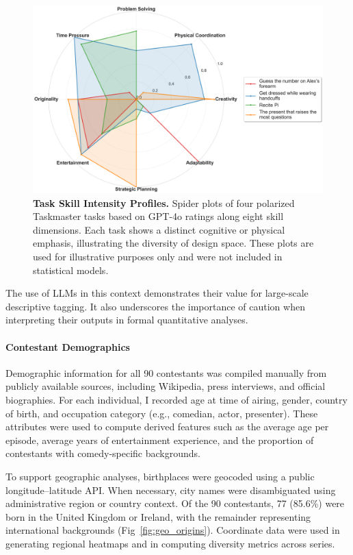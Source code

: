 \documentclass[10pt,letterpaper]{article}
\begin{document}
\begin{figure}[!h]
\centering
\includegraphics[width=\linewidth]{FiguresPNG/Fig3.png}
\caption{{\bf Task Skill Intensity Profiles.}
Spider plots of four polarized Taskmaster tasks based on GPT-4o ratings along eight skill dimensions. Each task shows a distinct cognitive or physical emphasis, illustrating the diversity of design space. These plots are used for illustrative purposes only and were not included in statistical models.}
\label{fig:task_skills}
\end{figure}
\FloatBarrier

The use of LLMs in this context demonstrates their value for large-scale descriptive tagging. It also underscores the importance of caution when interpreting their outputs in formal quantitative analyses.

\paragraph{Contestant Demographics}
Demographic information for all 90 contestants was compiled manually from publicly available sources, including Wikipedia, press interviews, and official biographies. For each individual, I recorded age at time of airing, gender, country of birth, and occupation category (e.g., comedian, actor, presenter). These attributes were used to compute derived features such as the average age per episode, average years of entertainment experience, and the proportion of contestants with comedy-specific backgrounds.

To support geographic analyses, birthplaces were geocoded using a public longitude–latitude API. When necessary, city names were disambiguated using administrative region or country context. Of the 90 contestants, 77 (85.6\%) were born in the United Kingdom or Ireland, with the remainder representing international backgrounds (Fig~\ref{fig:geo_origins}). Coordinate data were used in generating regional heatmaps and in computing diversity metrics across series.
\end{document}

